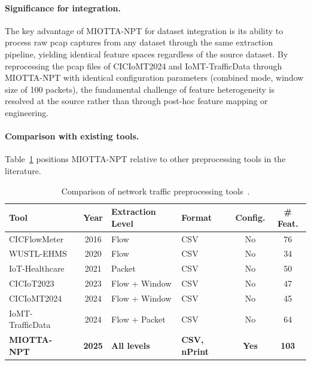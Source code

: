 \paragraph{Significance for integration.} The key advantage of MIOTTA-NPT for dataset integration is its ability to process raw \gls{pcap} captures from any dataset through the same extraction pipeline, yielding identical feature spaces regardless of the source dataset. By reprocessing the \gls{pcap} files of CICIoMT2024 and IoMT-TrafficData through MIOTTA-NPT with identical configuration parameters (combined mode, window size of 100 packets), the fundamental challenge of feature heterogeneity is resolved at the source rather than through post-hoc feature mapping or engineering.

\paragraph{Comparison with existing tools.} Table~\ref{tab:tool-comparison} positions MIOTTA-NPT relative to other preprocessing tools in the literature.

\begin{table}[htbp]
\centering
\caption{Comparison of network traffic preprocessing tools~\cite{leon2025miotta}.}
\label{tab:tool-comparison}
\small
\begin{tabularx}{\textwidth}{@{}l c X p{2.2cm} c c@{}}
\toprule
\textbf{Tool} & \textbf{Year} & \textbf{Extraction Level} & \textbf{Format} & \textbf{Config.} & \textbf{\# Feat.} \\
\midrule
CICFlowMeter~\cite{cicflowmeter} & 2016 & Flow & CSV & No & 76 \\
WUSTL-EHMS~\cite{hady2020ids} & 2020 & Flow & CSV & No & 34 \\
IoT-Healthcare~\cite{hussain2021framework} & 2021 & Packet & CSV & No & 50 \\
CICIoT2023~\cite{neto2023ciciot2023} & 2023 & Flow + Window & CSV & No & 47 \\
CICIoMT2024~\cite{dadkhah2024ciciomt} & 2024 & Flow + Window & CSV & No & 45 \\
IoMT-TrafficData~\cite{areia2024iomt} & 2024 & Flow + Packet & CSV & No & 64 \\
\textbf{MIOTTA-NPT}~\cite{leon2025miotta} & \textbf{2025} & \textbf{All levels} & \textbf{CSV, nPrint} & \textbf{Yes} & \textbf{103} \\
\bottomrule
\end{tabularx}
\end{table}

